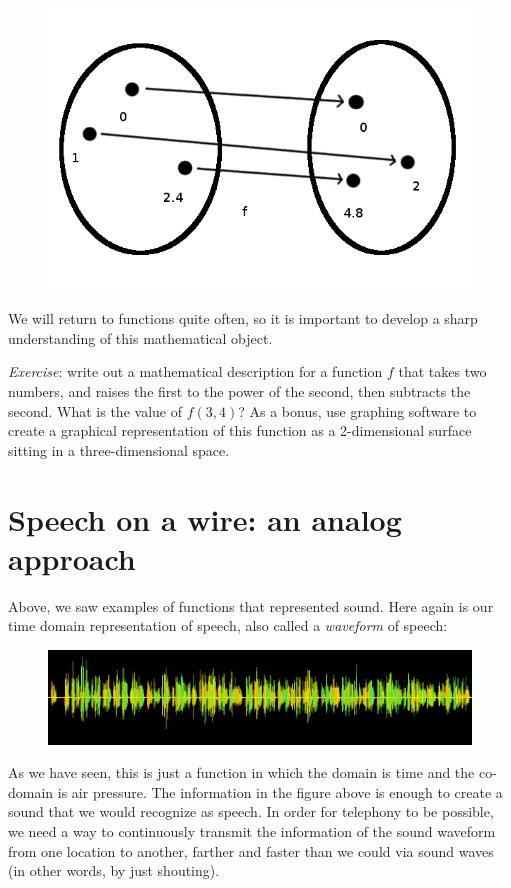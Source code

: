 \documentclass[UTF8]{book}
\begin{document}
\begin{CJK}{UTF8}{gbsn}
\begin{figure}[H]
\centering
\includegraphics[width=0.8\linewidth]{function_2x}
\end{figure}

We will return to functions quite often, so it is important to develop a sharp understanding of this mathematical object. \newline

\emph{Exercise}: write out a mathematical description for a function $f$ that takes two numbers, and raises the first to the power of the second, then subtracts the second. What is the value of $f(3,4)$? As a bonus, use graphing software to create a graphical representation of this function as a 2-dimensional surface sitting in a three-dimensional space.

\section{Speech on a wire: an analog approach}

Above, we saw examples of functions that represented sound. Here again is our time domain representation of speech, also called a \emph{waveform} of speech:

\begin{figure}[H]
\centering
\includegraphics[width=0.8\linewidth]{shakespeare_speech}
\end{figure}

As we have seen, this is just a function in which the domain is time and the co-domain is air pressure. The information in the figure above is enough to create a sound that we would recognize as speech. In order for telephony to be possible, we need a way to continuously transmit the information of the sound waveform from one location to another, farther and faster than we could via sound waves (in other words, by just shouting).


\end{CJK}
\end{document}
